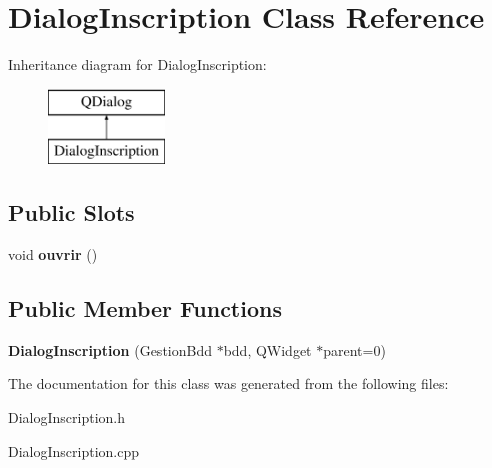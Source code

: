 \section{Dialog\-Inscription Class Reference}
\label{class_dialog_inscription}
Inheritance diagram for Dialog\-Inscription\-:\begin{figure}[H]
\begin{center}
\leavevmode
\includegraphics[height=2.000000cm]{class_dialog_inscription}
\end{center}
\end{figure}
\subsection*{Public Slots}
\begin{DoxyCompactItemize}
\item 
void {\bfseries ouvrir} ()\label{class_dialog_inscription_ac5daf1277af0ca1e3651f57348ac9169}

\end{DoxyCompactItemize}
\subsection*{Public Member Functions}
\begin{DoxyCompactItemize}
\item 
{\bfseries Dialog\-Inscription} (Gestion\-Bdd $\ast$bdd, Q\-Widget $\ast$parent=0)\label{class_dialog_inscription_ac5cbb6acd3d4f6f9a196a09e99aeb0af}

\end{DoxyCompactItemize}


The documentation for this class was generated from the following files\-:\begin{DoxyCompactItemize}
\item 
Dialog\-Inscription.\-h\item 
Dialog\-Inscription.\-cpp\end{DoxyCompactItemize}
